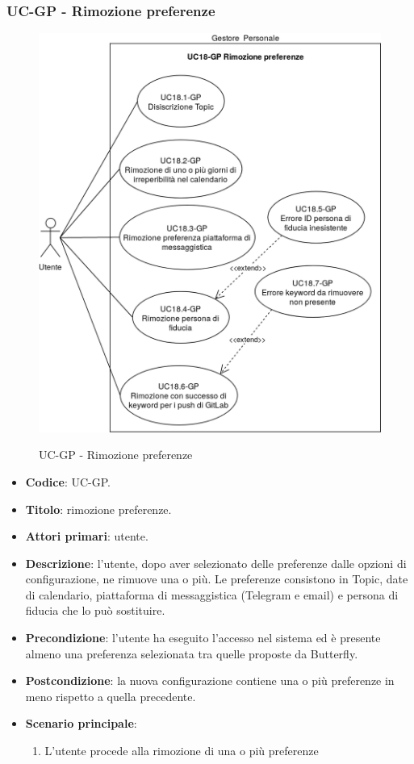 \subsubsection{UC\theuccount-GP - Rimozione preferenze}
		\begin{figure}[H]
			\centering
				\includegraphics[width=\textwidth]{img/casi_d'uso/UC18.png}\\
			\caption{UC\theuccount-GP - Rimozione preferenze}
		\end{figure}
	\begin{itemize}
		\item \textbf{Codice}: UC\theuccount-GP.
		\item \textbf{Titolo}: rimozione preferenze.
		\item \textbf{Attori primari}: utente.
		\item \textbf{Descrizione}: l’utente, dopo aver selezionato delle preferenze dalle opzioni di configurazione, ne rimuove una o più. Le preferenze consistono in Topic, date di calendario, piattaforma di messaggistica (Telegram e email) e persona di fiducia che lo può sostituire.
		\item \textbf{Precondizione}: l’utente ha eseguito l'accesso nel sistema ed è presente almeno	una preferenza selezionata tra quelle proposte da Butterfly.
		\item \textbf{Postcondizione}: la nuova configurazione contiene una o più preferenze in meno rispetto	a quella precedente.
		\item \textbf{Scenario principale}:
		\begin{enumerate}
			\item L'utente procede alla rimozione di una o più preferenze
		\end{enumerate}
	\end{itemize}

